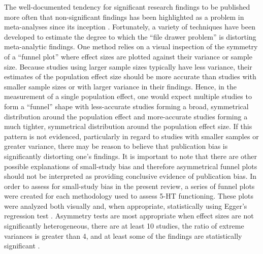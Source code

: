\documentclass[jou]{apa6}
\begin{document}
The well-documented tendency for significant research findings to be published more often that non-significant findings has been highlighted as a problem in meta-analyses since its inception \parencite[see][]{Sutton09}. Fortunately, a variety of techniques have been developed to estimate the degree to which the ``file drawer problem'' \parencite[][638]{Rosenthal79} is distorting meta-analytic findings. One method relies on a visual inspection of the symmetry of a ``funnel plot'' where effect sizes are plotted against their variance or sample size. Because studies using larger sample sizes typically have less variance, their estimates of the population effect size should be more accurate than studies with smaller sample sizes or with larger variance in their findings.  Hence, in the measurement of a single population effect, one would expect multiple studies to form a ``funnel'' shape with less-accurate studies forming a broad, symmetrical distribution around the population effect and more-accurate studies forming a much tighter, symmetrical distribution around the population effect size. If this pattern is not evidenced, particularly in regard to studies with smaller samples or greater variance, there may be reason to believe that publication bias is significantly distorting one's findings. It is important to note that there are other possible explanations of small-study bias and therefore asymmetrical funnel plots should not be interpreted as providing conclusive evidence of publication bias. In order to assess for small-study bias in the present review, a series of funnel plots were created for each methodology used to assess 5-HT functioning. These plots were analyzed both visually and, when appropriate, statistically using Egger's regression test \parencite{Egger97}. Asymmetry tests are most appropriate when effect sizes are not significantly heterogeneous, there are at least 10 studies, the ratio of extreme variances is greater than 4, and at least some of the findings are statistically significant \parencite{Ioannidis2007}.


\printbibliography
\end{document}
